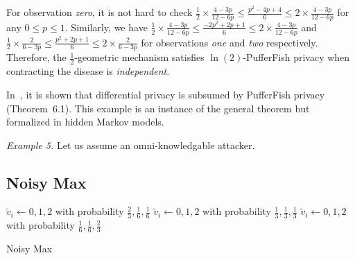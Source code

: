 For observation \textit{zero}, it is not hard to check $\frac{1}{2}
\times \frac{4-3p}{12-6p} \leq \frac{p^2 - 4p + 4}{6} \leq 2 \times
\frac{4-3p}{12-6p}$ for any $0 \leq p \leq 1$. Similarly, we have
$\frac{1}{2} \times 
\frac{4-3p}{12-6p} \leq \frac{-2p^2 + 2p + 1}{6} \leq 2 \times
\frac{4-3p}{12-6p}$ and $\frac{1}{2} \times \frac{2}{6-3p} \leq
\frac{p^2 + 2p + 1}{6} \leq 2 \times \frac{2}{6-3p}$  for observations
\textit{one} and \textit{two} respectively. Therefore, the
$\frac{1}{2}$-geometric mechanism satisfies $\ln(2)$-PufferFish
privacy when contracting the disease is \emph{independent}. 
 
In~\cite{KM:14:PFMPD}, it is shown that differential privacy is
subsumed by PufferFish privacy (Theorem~6.1). This example is an
instance of the general theorem but formalized in hidden Markov
models. 

\noindent
\textit{Example 5.}
Let us assume an omni-knowledgable attacker.

\subsection{Noisy Max}

\begin{algorithm}
  \begin{algorithmic}[1]
                {$\tilde{v}_i \leftarrow 0, 1, 2$ with probability
                 $\frac{2}{3}, \frac{1}{6}, \frac{1}{6}$}
                {$\tilde{v}_i \leftarrow 0, 1, 2$ with probability
                 $\frac{1}{3}, \frac{1}{3}, \frac{1}{3}$}
                {$\tilde{v}_i \leftarrow 0, 1, 2$ with probability
                 $\frac{1}{6}, \frac{1}{6}, \frac{2}{3}$}
        \EndMatch
      \EndFor
    \EndProcedure
  \end{algorithmic}
  \caption{Noisy Max}
  \label{algorithm:noisy-max}
\end{algorithm}

